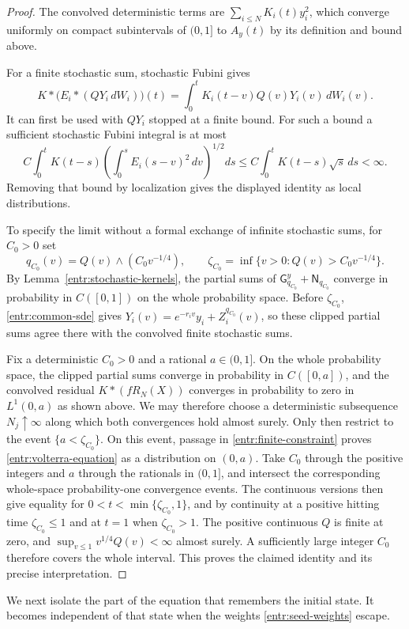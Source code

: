 \begin{proof}
The convolved deterministic terms are
\(\sum_{i\le N}K_i(t)y_i^2\), which converge uniformly on compact
subintervals of \((0,1]\) to \(A_y(t)\) by its definition and bound
above.

For a finite stochastic sum, stochastic Fubini gives
\[
 K*\bigl(E_i*(QY_i\,dW_i)\bigr)(t)
       =\int_0^t K_i(t-v)Q(v)Y_i(v)\,dW_i(v).
\]
It can first be used with \(QY_i\) stopped at a finite bound.
For such a bound a sufficient stochastic Fubini integral is at most
\[
 C\int_0^t K(t-s)
       \left(\int_0^s E_i(s-v)^2\,dv\right)^{1/2}ds
 \le C\int_0^t K(t-s)\sqrt s\,ds<\infty.
\]
Removing that bound by localization gives the displayed identity as
local distributions.

To specify the limit without a formal exchange of infinite stochastic
sums, for \(C_0>0\) set
\[
 q_{C_0}(v)=Q(v)\wedge(C_0v^{-1/4}),\qquad
 \zeta_{C_0}=\inf\{v>0:Q(v)>C_0v^{-1/4}\}.
\]
By Lemma~\ref{entr:stochastic-kernels}, the partial sums of
\(\mathsf G_{q_{C_0}}^y+\mathsf N_{q_{C_0}}\) converge in probability
in \(C([0,1])\) on the whole probability space.  Before
\(\zeta_{C_0}\), \eqref{entr:common-sde} gives
\(Y_i(v)=e^{-r_iv}y_i+Z_i^{q_{C_0}}(v)\), so these clipped partial
sums agree there with the convolved finite stochastic sums.

Fix a deterministic \(C_0>0\) and a rational \(a\in(0,1]\).
On the whole probability space, the clipped partial sums converge in
probability in \(C([0,a])\), and the convolved residual
\(K*(fR_N(X))\) converges in probability to zero in \(L^1(0,a)\)
as shown above.  We may therefore choose a deterministic subsequence
\(N_j\uparrow\infty\) along which both convergences hold almost surely.
Only then restrict to the event \(\{a<\zeta_{C_0}\}\).  On this event,
passage in \eqref{entr:finite-constraint} proves
\eqref{entr:volterra-equation} as a distribution on \((0,a)\).
Take \(C_0\) through the positive integers and \(a\) through the
rationals in \((0,1]\), and intersect the corresponding whole-space
probability-one convergence events.  The continuous versions then give
equality for \(0<t<\min\{\zeta_{C_0},1\}\), and by continuity at a
positive hitting time \(\zeta_{C_0}\le1\) and at \(t=1\) when
\(\zeta_{C_0}>1\).
The positive continuous \(Q\) is finite at zero, and
\(\sup_{v\le1}v^{1/4}Q(v)<\infty\) almost surely.  A sufficiently
large integer \(C_0\) therefore covers the whole interval.  This proves the
claimed identity and its precise interpretation.
\end{proof}

We next isolate the part of the equation that remembers the initial
state.  It becomes independent of that state when the weights
\eqref{entr:seed-weights} escape.

